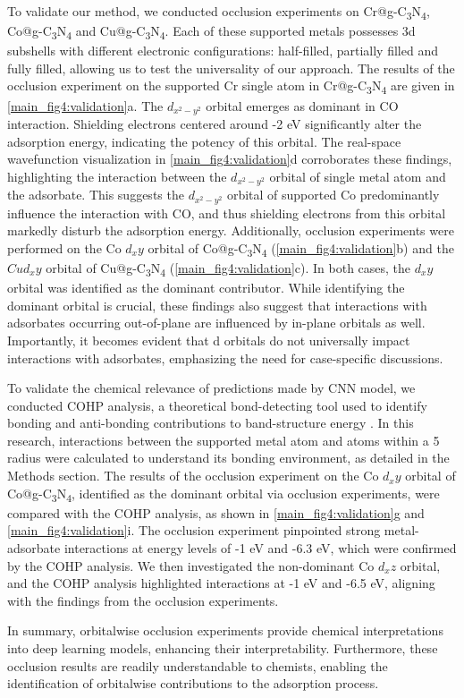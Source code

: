To validate our method, we conducted occlusion experiments on Cr@g-C\textsubscript{3}N\textsubscript{4}, Co@g-C\textsubscript{3}N\textsubscript{4} and Cu@g-C\textsubscript{3}N\textsubscript{4}.
Each of these supported metals possesses 3d subshells with different electronic configurations: half-filled, partially filled and fully filled, allowing us to test the universality of our approach.
The results of the occlusion experiment on the supported Cr single atom in Cr@g-C\textsubscript{3}N\textsubscript{4} are given in \cref{main_fig4:validation}a.
The $d_{x^2-y^2}$ orbital emerges as dominant in CO interaction.
Shielding electrons centered around -2 eV significantly alter the adsorption energy, indicating the potency of this orbital.
The real-space wavefunction visualization in \cref{main_fig4:validation}d corroborates these findings, highlighting the interaction between the $d_{x^2-y^2}$ orbital of single metal atom and the adsorbate.
This suggests the $d_{x^2-y^2}$ orbital of supported Co predominantly influence the interaction with CO, and thus shielding electrons from this orbital markedly disturb the adsorption energy.
Additionally, occlusion experiments were performed on the Co $d_xy$ orbital of Co@g-C\textsubscript{3}N\textsubscript{4} (\cref{main_fig4:validation}b) and the $Cu d_xy$ orbital of Cu@g-C\textsubscript{3}N\textsubscript{4} (\cref{main_fig4:validation}c).
In both cases, the $d_xy$ orbital was identified as the dominant contributor.
While identifying the dominant orbital is crucial, these findings also suggest that interactions with adsorbates occurring out-of-plane are influenced by in-plane orbitals as well.
Importantly, it becomes evident that d orbitals do not universally impact interactions with adsorbates, emphasizing the need for case-specific discussions.

To validate the chemical relevance of predictions made by CNN model, we conducted COHP analysis, a theoretical bond-detecting tool used to identify bonding and anti-bonding contributions to band-structure energy \cite{deringer2011crystal}.
In this research, interactions between the supported metal atom and atoms within a 5 \text{\AA} radius were calculated to understand its bonding environment, as detailed in the Methods section.
The results of the occlusion experiment on the Co $d_xy$ orbital of Co@g-C\textsubscript{3}N\textsubscript{4}, identified as the dominant orbital via occlusion experiments, were compared with the COHP analysis, as shown in \cref{main_fig4:validation}g and \cref{main_fig4:validation}i.
The occlusion experiment pinpointed strong metal-adsorbate interactions at energy levels of -1 eV and -6.3 eV, which were confirmed by the COHP analysis.
We then investigated the non-dominant Co $d_xz$ orbital, and the COHP analysis highlighted interactions at -1 eV and -6.5 eV, aligning with the findings from the occlusion experiments.

In summary, orbitalwise occlusion experiments provide chemical interpretations into deep learning models, enhancing their interpretability.
Furthermore, these occlusion results are readily understandable to chemists, enabling the identification of orbitalwise contributions to the adsorption process.
